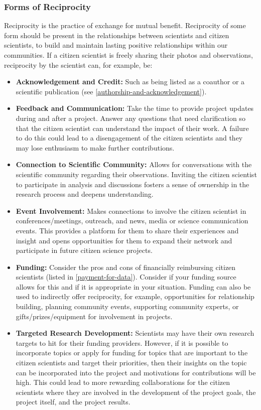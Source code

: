 \documentclass{article}
\newcommand{\contributed}[1]{%
    \par\noindent
    \begingroup
    \setlength{\leftskip}{1em}%
    \itshape
    Contributors: #1
    \par
    \endgroup
    \vspace{0.5em}
}
\begin{document}
\subsubsection{Forms of Reciprocity}
\label{forms-of-reciprocity}
Reciprocity is the practice of exchange for mutual benefit. Reciprocity of some form should be present in the relationships between scientists and citizen scientists, to build and maintain lasting positive relationships within our communities. If a citizen scientist is freely sharing their photos and observations, reciprocity by the scientist can, for example, be:

\begin{itemize}

    \item \textbf{Acknowledgement and Credit:} Such as being listed as a coauthor or a scientific publication (see \ref{authorship-and-acknowledgement}).
    \item \textbf{Feedback and Communication:} Take the time to provide project updates during and after a project. Answer any questions that need clarification so that the citizen scientist can understand the impact of their work. A failure to do this could lead to a disengagement of the citizen scientists and they may lose enthusiasm to make further contributions.
    \item \textbf{Connection to Scientific Community:} Allows for conversations with the scientific community regarding their observations. Inviting the citizen scientist to participate in analysis and discussions fosters a sense of ownership in the research process and deepens understanding.
    \item \textbf{Event Involvement:} Makes connections to involve the citizen scientist in conferences/meetings, outreach, and news, media or science communication events. This provides a platform for them to share their experiences and insight and opens opportunities for them to expand their network and participate in future citizen science projects.
    \item \textbf{Funding: } Consider the pros and cons of financially reimbursing citizen scientists (listed in \ref{payment-for-data}). Consider if your funding source allows for this and if it is appropriate in your situation. Funding can also be used to indirectly offer reciprocity, for example, opportunities for relationship building, planning community events, supporting community experts, or gifts/prizes/equipment for involvement in projects.
    \item \textbf{Targeted Research Development:} Scientists may have their own research targets to hit for their funding providers. However, if it is possible to incorporate topics or apply for funding for topics that are important to the citizen scientists and target their priorities, then their insights on the topic can be incorporated into the project and motivations for contributions will be high. This could lead to more rewarding collaborations for the citizen scientists where they are involved in the development of the project goals, the project itself, and the project results.
    
\end{itemize}
\end{document}
